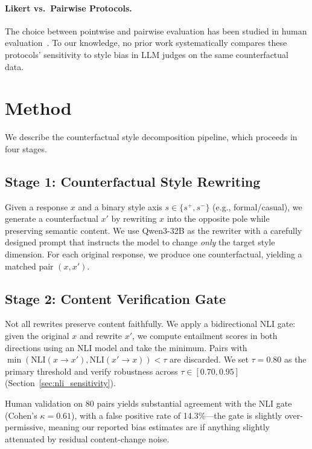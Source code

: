 \documentclass[11pt,a4paper]{article}
\begin{document}
\paragraph{Likert vs.\ Pairwise Protocols.}
The choice between pointwise and pairwise evaluation has been studied in human evaluation~\citep{novikova2018rankme,kiritchenko2017best}.
To our knowledge, no prior work systematically compares these protocols' sensitivity to style bias in LLM judges on the same counterfactual data.

\section{Method}

We describe the counterfactual style decomposition pipeline, which proceeds in four stages.

\subsection{Stage 1: Counterfactual Style Rewriting}

Given a response $x$ and a binary style axis $s \in \{s^+, s^-\}$ (e.g., formal/casual), we generate a counterfactual $x'$ by rewriting $x$ into the opposite pole while preserving semantic content.
We use Qwen3-32B as the rewriter with a carefully designed prompt that instructs the model to change \emph{only} the target style dimension.
For each original response, we produce one counterfactual, yielding a matched pair $(x, x')$.

\subsection{Stage 2: Content Verification Gate}

Not all rewrites preserve content faithfully.
We apply a bidirectional NLI gate: given the original $x$ and rewrite $x'$, we compute entailment scores in both directions using an NLI model and take the minimum.
Pairs with $\min(\text{NLI}(x \to x'), \text{NLI}(x' \to x)) < \tau$ are discarded.
We set $\tau = 0.80$ as the primary threshold and verify robustness across $\tau \in [0.70, 0.95]$ (Section~\ref{sec:nli_sensitivity}).

Human validation on 80 pairs yields substantial agreement with the NLI gate (Cohen's $\kappa = 0.61$), with a false positive rate of 14.3\%---the gate is slightly over-permissive, meaning our reported bias estimates are if anything slightly attenuated by residual content-change noise.
\end{document}
